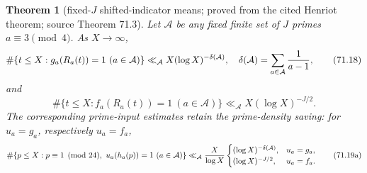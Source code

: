 \documentclass[10pt,reqno]{amsart}
\newtheorem{theorem}{Theorem}[section]
\theoremstyle{definition}
\newcommand{\1}{\mathbf 1}
\begin{document}
\begin{theorem}[fixed-$J$ shifted-indicator means; proved from the cited
Henriot theorem; source Theorem 71.3]\label{thm:fixed-J-means}  Let $\mathcal A$ be any fixed finite set of $J$ primes
$a\equiv3\pmod4$.  As $X\to\infty$,
\begin{equation}
 \#\{t\leq X:g_a(R_a(t))=1\ (a\in\mathcal A)\}
 \ll_\mathcal AX(\log X)^{-\delta(\mathcal A)},
 \quad \delta(\mathcal A)=\sum_{a\in\mathcal A}{1\over a-1}, \tag{71.18}
\end{equation}
and
\begin{equation}
 \#\{t\leq X:f_a(R_a(t))=1\ (a\in\mathcal A)\}
 \ll_\mathcal AX(\log X)^{-J/2}.                       \tag{71.19}
\end{equation}
The corresponding prime-input estimates retain the prime-density saving:
for $u_a=g_a$, respectively $u_a=f_a$,
\begin{equation}
 \#\{p\leq X:p\equiv1\pmod {24},\
             u_a(h_a(p))=1\ (a\in\mathcal A)\}
 \ll_\mathcal A {X\over\log X}
 \begin{cases}
  (\log X)^{-\delta(\mathcal A)},&u_a=g_a,\\
  (\log X)^{-J/2},&u_a=f_a.
 \end{cases}                                             \tag{71.19a}
\end{equation}

\end{theorem}
\end{document}
